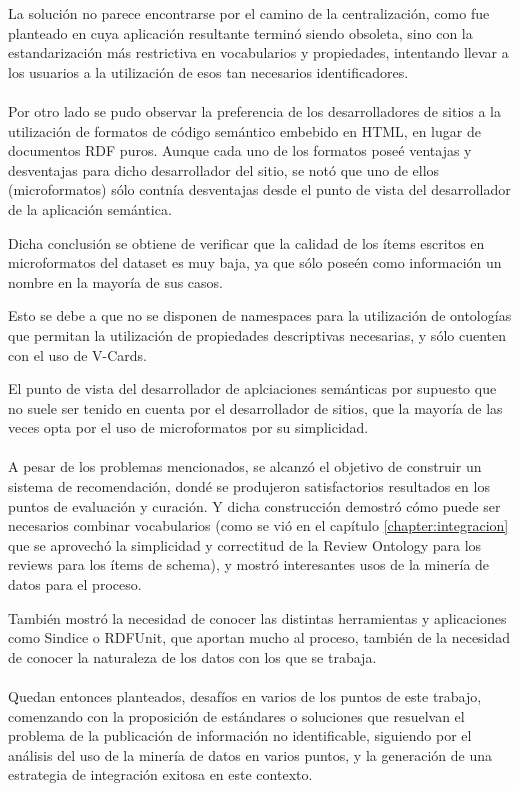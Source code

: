 La solución no parece encontrarse por el camino de la centralización, como fue planteado en \cite{Heath2006J} cuya
aplicación resultante terminó siendo obsoleta,
sino con la estandarización más restrictiva en vocabularios y propiedades, intentando 
llevar a los usuarios a la utilización de esos tan necesarios identificadores.
\\\\
Por otro lado se pudo observar la preferencia de los desarrolladores de sitios a la utilización de 
formatos de código semántico embebido en HTML, en lugar de documentos RDF puros. Aunque cada uno de 
los formatos poseé ventajas y desventajas para dicho desarrollador del sitio, se notó que uno de ellos 
(microformatos) sólo contnía desventajas desde el punto de vista del desarrollador de la aplicación 
semántica. 

Dicha conclusión  se obtiene de verificar que la calidad de los ítems escritos en microformatos del 
dataset es muy baja, ya que sólo poseén como información un nombre en la mayoría de sus casos.

Esto se debe a que no se disponen de namespaces para la utilización de ontologías que permitan 
la utilización de propiedades descriptivas necesarias, y sólo cuenten con el uso de V-Cards.

El punto de vista del desarrollador de aplciaciones semánticas por supuesto que no suele ser tenido 
en cuenta por el desarrollador de sitios, que la mayoría de las veces opta por el uso de 
microformatos por su simplicidad.
\\\\
A pesar de los problemas mencionados, se alcanzó el objetivo de construir un sistema de recomendación, 
dondé se produjeron satisfactorios resultados en los puntos de evaluación y curación. 
Y dicha construcción demostró cómo puede ser necesarios combinar vocabularios (como se vió en 
el capítulo \ref{chapter:integracion} que se aprovechó la simplicidad y correctitud de la 
Review Ontology para los reviews para los ítems de schema), y mostró interesantes usos 
de la minería de datos para el proceso.

También mostró la necesidad de conocer las distintas herramientas y aplicaciones como Sindice 
o RDFUnit, que aportan mucho al proceso, también de la necesidad de conocer la naturaleza de 
los datos con los que se trabaja.
\\\\
Quedan entonces planteados, desafíos en varios de los puntos de este trabajo, comenzando con 
la proposición de estándares o soluciones que resuelvan el problema de la publicación de información 
no identificable, siguiendo por el análisis del uso de la minería de datos en varios puntos, y 
la generación de una estrategia de integración exitosa en este contexto. 

